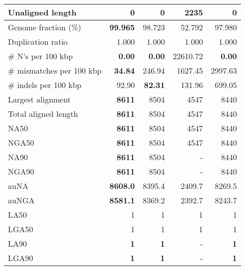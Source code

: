 \documentclass[12pt,a4paper]{article}
\begin{document}
\begin{table}[ht]
\begin{center}
\begin{tabular}{|l*{4}{|r}|}
Unaligned length & {\bf 0} & {\bf 0} & 2235 & {\bf 0} \\ \hline
Genome fraction (\%) & {\bf 99.965} & 98.723 & 52.792 & 97.980 \\ \hline
Duplication ratio & 1.000 & 1.000 & 1.000 & 1.000 \\ \hline
\# N's per 100 kbp & {\bf 0.00} & {\bf 0.00} & 22610.72 & {\bf 0.00} \\ \hline
\# mismatches per 100 kbp & {\bf 34.84} & 246.94 & 1627.45 & 2997.63 \\ \hline
\# indels per 100 kbp & 92.90 & {\bf 82.31} & 131.96 & 699.05 \\ \hline
Largest alignment & {\bf 8611} & 8504 & 4547 & 8440 \\ \hline
Total aligned length & {\bf 8611} & 8504 & 4547 & 8440 \\ \hline
NA50 & {\bf 8611} & 8504 & 4547 & 8440 \\ \hline
NGA50 & {\bf 8611} & 8504 & 4547 & 8440 \\ \hline
NA90 & {\bf 8611} & 8504 & - & 8440 \\ \hline
NGA90 & {\bf 8611} & 8504 & - & 8440 \\ \hline
auNA & {\bf 8608.0} & 8395.4 & 2409.7 & 8269.5 \\ \hline
auNGA & {\bf 8581.1} & 8369.2 & 2392.7 & 8243.7 \\ \hline
LA50 & 1 & 1 & 1 & 1 \\ \hline
LGA50 & 1 & 1 & 1 & 1 \\ \hline
LA90 & {\bf 1} & {\bf 1} & - & {\bf 1} \\ \hline
LGA90 & {\bf 1} & {\bf 1} & - & {\bf 1} \\ \hline
\end{tabular}
\end{center}
\end{table}
\end{document}
